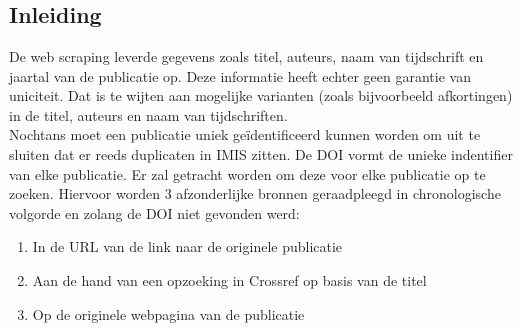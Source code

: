 
\chapter{}%
\label{ch:linked_data}

\section{Inleiding}
De web scraping leverde gegevens zoals titel, auteurs, naam van tijdschrift en jaartal van de publicatie op. Deze informatie heeft echter geen garantie van uniciteit. Dat is te wijten aan mogelijke varianten (zoals bijvoorbeeld afkortingen) in de titel, auteurs en naam van tijdschriften.\\
Nochtans moet een publicatie uniek geïdentificeerd kunnen worden om uit te sluiten dat er reeds duplicaten in IMIS zitten.
De DOI vormt de unieke indentifier van elke publicatie. Er zal getracht worden om deze voor elke publicatie op te zoeken. Hiervoor worden 3 afzonderlijke bronnen geraadpleegd in chronologische volgorde en zolang de DOI niet gevonden werd:
\begin{enumerate}
    \item In de URL van de link naar de originele publicatie
    \item Aan de hand van een opzoeking in Crossref op basis van de titel
    \item Op de originele webpagina van de publicatie
\end{enumerate}

